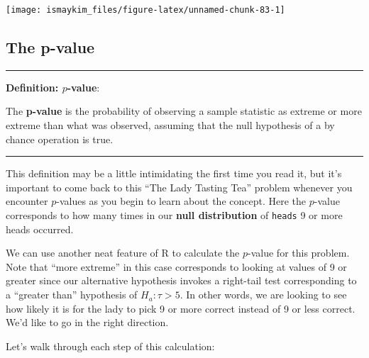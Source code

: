 \documentclass[]{tufte-book}
\newenvironment{Shaded}{\begin{snugshade}}{\end{snugshade}}
\newcommand{\KeywordTok}[1]{\textcolor[rgb]{0.13,0.29,0.53}{\textbf{{#1}}}}
\newcommand{\DecValTok}[1]{\textcolor[rgb]{0.00,0.00,0.81}{{#1}}}
\newcommand{\StringTok}[1]{\textcolor[rgb]{0.31,0.60,0.02}{{#1}}}
\newcommand{\NormalTok}[1]{{#1}}
\let\oldrule=\rule
\renewcommand{\rule}[1]{\oldrule{\linewidth}}
\begin{document}
\begin{center}\texttt{[image: ismaykim\_files/figure-latex/unnamed-chunk-83-1]} \end{center}

\subsection{The p-value}\label{the-p-value}

\begin{center}\rule{0.5\linewidth}{\linethickness}\end{center}

\textbf{Definition: \(p\)-value}:

The \textbf{p-value} is the probability of observing a sample statistic
as extreme or more extreme than what was observed, assuming that the
null hypothesis of a by chance operation is true.

\begin{center}\rule{0.5\linewidth}{\linethickness}\end{center}

This definition may be a little intimidating the first time you read it,
but it's important to come back to this ``The Lady Tasting Tea'' problem
whenever you encounter \(p\)-values as you begin to learn about the
concept. Here the \(p\)-value corresponds to how many times in our
\textbf{null distribution} of \texttt{heads} 9 or more heads occurred.

We can use another neat feature of R to calculate the \(p\)-value for
this problem. Note that ``more extreme'' in this case corresponds to
looking at values of 9 or greater since our alternative hypothesis
invokes a right-tail test corresponding to a ``greater than'' hypothesis
of \(H_a: \tau > 5\). In other words, we are looking to see how likely
it is for the lady to pick 9 or more correct instead of 9 or less
correct. We'd like to go in the right direction.

\begin{Shaded}
\end{Shaded}

Let's walk through each step of this calculation:
\end{document}
